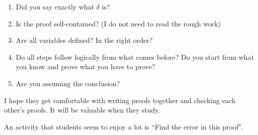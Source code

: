 \documentclass[11pt]{article}
\begin{document}
\begin{example}
\begin{comments}
\begin{center}
\begin{minipage}{0.8\textwidth}
\begin{enumerate}
						\item Did you say exactly what $\delta$ is?

						\item Is the proof self-contained? (I do not need to read the rough work)

						\item Are all variables defined? In the right order?

						\item Do all steps follow logically from what comes before? Do you
							start from what you know and prove what you have to prove?

						\item Are you assuming the conclusion?
					\end{enumerate}
				\end{minipage}
			\end{center}I hope they get comfortable with writing proofs together and checking
			each other's proofs. It will be valuable when they study.
		\end{comments}
	\end{example}


	\newpage

	An activity that students seem to enjoy a lot is ``Find the error in this
	proof".
\end{document}
